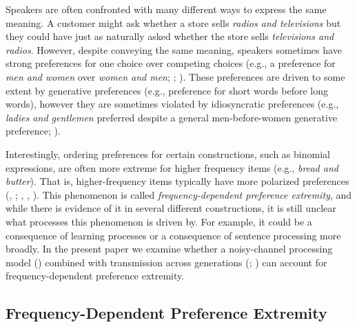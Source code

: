 \documentclass[
  12pt,
  letterpaper,
]{scrreport}
\begin{document}
Speakers are often confronted with many different ways to express the
same meaning. A customer might ask whether a store sells \emph{radios
and televisions} but they could have just as naturally asked whether the
store sells \emph{televisions and radios}. However, despite conveying
the same meaning, speakers sometimes have strong preferences for one
choice over competing choices (e.g., a preference for
\emph{men and women} over \emph{women and men};
;
). These preferences are driven to some extent by generative
preferences (e.g., preference for short words before long words),
however they are sometimes violated by idiosyncratic preferences (e.g.,
\emph{ladies and
gentlemen} preferred despite a general men-before-women generative
preference; ).

Interestingly, ordering preferences for certain constructions, such as
binomial expressions, are often more extreme for higher frequency items
(e.g., \emph{bread and butter}). That is, higher-frequency items
typically have more polarized preferences
(,
;
,
,
).
This phenomenon is called
\emph{frequency-dependent preference extremity}, and while there is
evidence of it in several different constructions, it is still unclear
what processes this phenomenon is driven by. For example, it could be a
consequence of learning processes or a consequence of sentence
processing more broadly. In the present paper we examine whether a
noisy-channel processing model
() combined with transmission across generations
(; ) can account for frequency-dependent preference
extremity.

\subsection{Frequency-Dependent Preference
Extremity}\label{frequency-dependent-preference-extremity}
\end{document}
